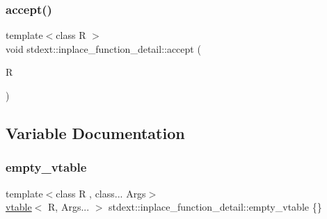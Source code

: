 \subsubsection{\texorpdfstring{accept()}{accept()}}
{\footnotesize\ttfamily template$<$class R $>$ \\
void stdext\+::inplace\+\_\+function\+\_\+detail\+::accept (\begin{DoxyParamCaption}\item[{R}]{ }\end{DoxyParamCaption})}



\subsection{Variable Documentation}
\mbox{\label{namespacestdext_1_1inplace__function__detail_a31403f05f455c45323900ed791032eda}} 
\subsubsection{\texorpdfstring{empty\+\_\+vtable}{empty\_vtable}}
{\footnotesize\ttfamily template$<$class R , class... Args$>$ \\
\hyperlink{structstdext_1_1inplace__function__detail_1_1vtable}{vtable}$<$ R, Args... $>$ stdext\+::inplace\+\_\+function\+\_\+detail\+::empty\+\_\+vtable \{\}}

